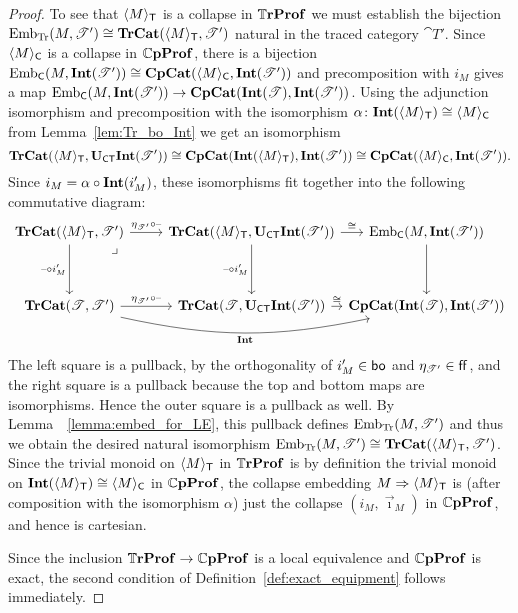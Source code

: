 \documentclass[11pt,oneside,article]{memoir}
\begin{document}
\begin{proof}
   To see that $\langle M\rangle_{\mathsf{T}}$ is a collapse in $\mathbb{T}\mathbf{rProf}$ we must establish the bijection $\mathrm{Emb}_{\mathrm{Tr}}(M,\mathscr{T}')\cong\mathbf{TrCat}(\langle M\rangle_{\mathsf{T}},\mathscr{T}')$ natural in the traced category $\cat{T}'$. Since $\langle M\rangle_{\mathsf{C}}$ is a collapse in $\mathbb{C}\mathbf{pProf}$, there is a bijection $\mathrm{Emb}_{\mathsf{C}}(M,\mathbf{Int}(\mathscr{T}'))\cong\mathbf{CpCat}(\langle M\rangle_{\mathsf{C}},\mathbf{Int}(\mathscr{T}'))$ and precomposition with $i_M$ gives a map $\mathrm{Emb}_{\mathsf{C}}(M,\mathbf{Int}(\mathscr{T}'))\to\mathbf{CpCat}(\mathbf{Int}(\mathscr{T}),\mathbf{Int}(\mathscr{T}'))$. Using the adjunction isomorphism and precomposition with the isomorphism $\alpha\colon\mathbf{Int}(\langle M\rangle_{\mathsf{T}})\cong\langle M\rangle_{\mathsf{C}}$ from Lemma~\ref{lem:Tr_bo_Int} we get an isomorphism
   \[\mathbf{TrCat}(\langle M\rangle_{\mathsf{T}},\mathbf{U}_{\mathsf{CT}}\mathbf{Int}(\mathscr{T}'))\cong\mathbf{CpCat}(\mathbf{Int}(\langle M\rangle_{\mathsf{T}}),\mathbf{Int}(\mathscr{T}'))\cong\mathbf{CpCat}(\langle M\rangle_{\mathsf{C}},\mathbf{Int}(\mathscr{T}')).\]
   Since $i_M=\alpha\circ\mathbf{Int}(i'_M)$, these isomorphisms fit together into the following commutative diagram:
   \[ \begin{tikzcd}[column sep=between origins,row sep=between origins]
      \TrCat(\Col{M}_{\MTCfont{T}},\cat{T}')
            \ar[r,"\eta_{\cat{T}'}\circ\textrm{--}"]
            \ar[dd,"\textrm{--}\circ i'_M"']
            \ar[ddr,phantom,"\lrcorner" very near start]
         &[2.4em,between borders] \TrCat(\Col{M}_{\MTCfont{T}},\UCT\Int(\cat{T}'))
            \ar[dd,"\textrm{--}\circ i'_M"']
            \ar[rr,"\iso"]
         &[6.4em]
         &[6.4em] \Emb_{\MTCfont{C}}(M,\Int(\cat{T}')) \ar[dd] \\[2em]\\[3.4em]
      \TrCat(\cat{T},\cat{T}')
            \ar[r,"\eta_{\cat{T}'}\circ\textrm{--}"]
            \ar[rrr,bend right=12,"\Int"']
         & \TrCat(\cat{T},\UCT\Int(\cat{T}'))
            \ar[rr,"\iso"]
         && \CompCat(\Int(\cat{T}),\Int(\cat{T}'))
   \end{tikzcd} \]
   The left square is a pullback, by the orthogonality of $i'_M\in\mathsf{bo}$ and $\eta_{\mathscr{T}'}\in\mathsf{ff}$, and the
   right square is a pullback because the top and bottom maps are isomorphisms. Hence the outer square is a pullback as well. By Lemma~~\ref{lemma:embed_for_LE}, this pullback defines $\mathrm{Emb}_{\mathrm{Tr}}(M,\mathscr{T}')$ and thus we obtain the desired natural isomorphism $\mathrm{Emb}_{\mathrm{Tr}}(M,\mathscr{T}')\cong\mathbf{TrCat}(\langle M\rangle_{\mathsf{T}},\mathscr{T}')$. Since the trivial monoid on $\langle M\rangle_{\mathsf{T}}$ in $\mathbb{T}\mathbf{rProf}$ is by definition the trivial monoid on $\mathbf{Int}(\langle M\rangle_{\mathsf{T}})\cong\langle M\rangle_{\mathsf{C}}$ in $\mathbb{C}\mathbf{pProf}$, the collapse embedding $M\Rightarrow\langle M\rangle_{\mathsf{T}}$ is (after composition with the isomorphism $\alpha$) just the collapse $(i_M,\vec{\imath}_M)$ in $\mathbb{C}\mathbf{pProf}$, and hence is cartesian.

   Since the inclusion $\mathbb{T}\mathbf{rProf}\to\mathbb{C}\mathbf{pProf}$ is a local equivalence and $\mathbb{C}\mathbf{pProf}$ is exact, the second condition of Definition~\ref{def:exact_equipment} follows immediately.
\end{proof}
\end{document}
